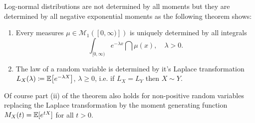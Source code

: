 Log-normal distributions are not determined by all moments but they are determined by all negative exponential moments as the following theorem shows:
\begin{lsuperwichtigersatz}
\begin{theorem}\label{cor_distributions_1}
	\begin{enumerate}[label=(\roman*)]
		\item Every measures $\mu \in \mathcal M_1([0,\infty)])$ is uniquely determined by all integrals $$\int_{[0,\infty)} e^{-\lambda x}\dint \mu(x),\quad \lambda>0.$$
		\item The law of a \underline{} random variable is determined by it's Laplace transformation $L_X(\lambda) \coloneqq \mathbb{E} \big[ e^{- \lambda X} \big]$, $\lambda \geq 0$, i.e. if $L_X=L_Y$ then $X\sim Y$.
	\end{enumerate}
\end{theorem}
\end{lsuperwichtigersatz}
Of course part (ii) of the theorem also holds for non-positive random variables replacing the Laplace transformation by the moment generating function $M_X(t)=\mathbb{E}[e^{tX}]$ for all $t>0$.
